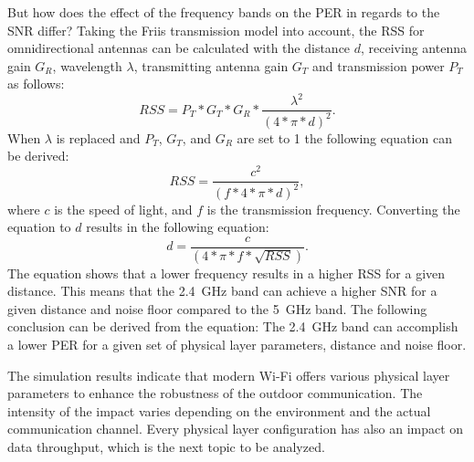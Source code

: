 But how does the effect of the frequency bands on the \ac{PER} in regards to the \ac{SNR} differ?
Taking the Friis transmission model \cite{shaw_radiometry_2012} into account, the \ac{RSS} for omnidirectional antennas can be calculated with the distance $d$,
receiving antenna gain $G_{R}$, wavelength $\lambda$, transmitting antenna gain $G_{T}$ and transmission power $P_{T}$  as follows:
\begin{equation}
   RSS = P_{T} * G_{T} * G_{R} * \frac{\lambda^2}{(4 * \pi * d)^2}.
\end{equation}
When $\lambda$ is replaced and  $P_{T}$,  $G_{T}$,  and $G_{R}$ are set to \num{1} the following equation can be derived:
\begin{equation}
   RSS = \frac{c^2}{(f* 4 * \pi * d)^2},
\end{equation}
where $c$ is the speed of light, and $f$ is the transmission frequency.
Converting the equation to $d$ results in the following equation:
\begin{equation}
   d = \frac{c}{(4 * \pi * f * \sqrt {RSS})}.
\end{equation}
The equation shows that a lower frequency results in a higher \ac{RSS} for a given distance.
This means that the \SI{2.4}{\giga\hertz} band can achieve a higher \ac{SNR} for a given distance and noise floor
compared to the \SI{5}{\giga\hertz} band.
The following conclusion can be derived from the equation: The \SI{2.4}{\giga\hertz} band can accomplish
a lower \ac{PER} for a given set of physical layer parameters, distance and noise floor.

The simulation results indicate that modern Wi-Fi offers various physical layer parameters to enhance the
robustness of the outdoor communication.
The intensity of the impact varies depending on the environment and the actual communication channel.
Every physical layer configuration has also an impact on data throughput, which is the next topic to be analyzed.
